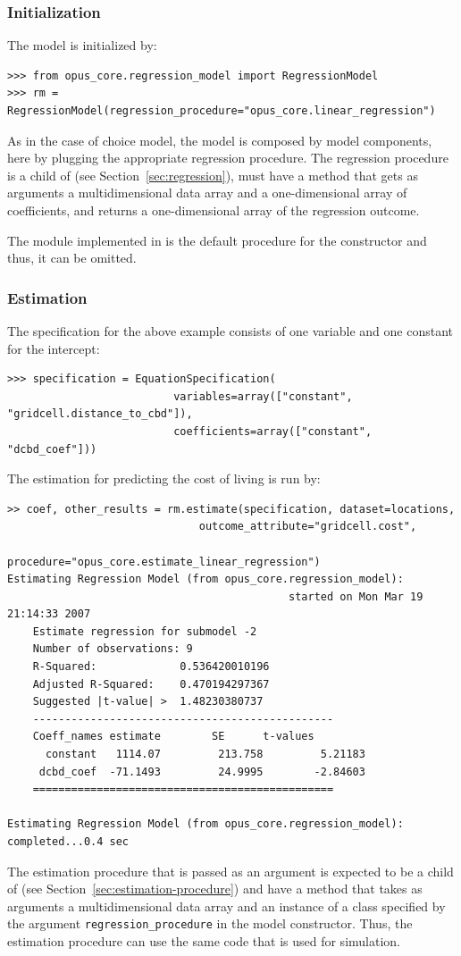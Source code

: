 %
\subsubsection{Initialization}
%
The model is initialized by:
\begin{verbatim}
>>> from opus_core.regression_model import RegressionModel
>>> rm = RegressionModel(regression_procedure="opus_core.linear_regression")
\end{verbatim}
As in the case of choice model, the model is composed by model components, here
by plugging the appropriate regression procedure. The
regression procedure is a child of  (see Section~\ref{sec:regression}),
must have a method  that gets as arguments a
multidimensional data array and a one-dimensional array of coefficients, and
returns a one-dimensional array of the regression outcome.

The  module implemented in  is the default
procedure for the  constructor and thus, it can be omitted.

%
\subsubsection{Estimation}
%
The specification for the above example consists of one variable and one
constant for the intercept:

\begin{verbatim}
>>> specification = EquationSpecification(
                          variables=array(["constant", "gridcell.distance_to_cbd"]),
                          coefficients=array(["constant", "dcbd_coef"]))
\end{verbatim}
The estimation for predicting the cost of living is run by:
\begin{verbatim}
>> coef, other_results = rm.estimate(specification, dataset=locations,
                              outcome_attribute="gridcell.cost",
                              procedure="opus_core.estimate_linear_regression")
Estimating Regression Model (from opus_core.regression_model):
                                            started on Mon Mar 19 21:14:33 2007
    Estimate regression for submodel -2
    Number of observations: 9
    R-Squared:             0.536420010196
    Adjusted R-Squared:    0.470194297367
    Suggested |t-value| >  1.48230380737
    -----------------------------------------------
    Coeff_names estimate        SE      t-values
      constant   1114.07         213.758         5.21183
     dcbd_coef  -71.1493         24.9995        -2.84603
    ===============================================

Estimating Regression Model (from opus_core.regression_model): completed...0.4 sec
\end{verbatim}
The estimation procedure that is passed as an argument is expected to be
a child of  (see Section~\ref{sec:estimation-procedure}) and have a
method  that takes as arguments a
multidimensional data array and an instance of a class specified by the
argument \verb|regression_procedure| in the model constructor. Thus, the
estimation procedure can use the same code that is used for simulation.

